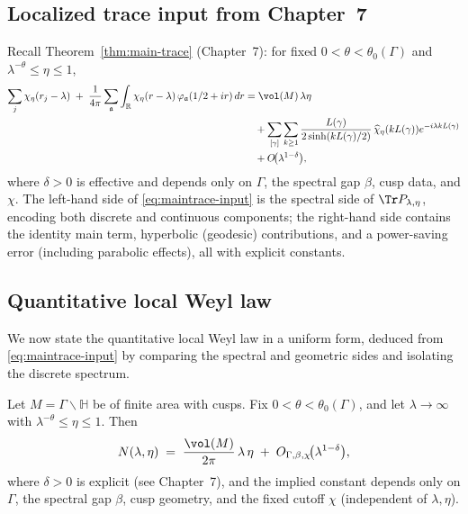 \subsection{Localized trace input from Chapter~7}
Recall Theorem~\ref{thm:main-trace} (Chapter~7): for fixed $0<\theta<\theta_0(\Gamma)$ and $\lambda^{-\theta}\le \eta\le 1$,
\begin{align}\label{eq:maintrace-input}
\sum_{j}\chi_\eta(r_j-\lambda)
\;+\;\frac{1}{4\pi}\sum_{\mathfrak{a}}
\int_{\mathbb{R}}\chi_\eta(r-\lambda)\,\varphi_{\mathfrak{a}}(1/2+ir)\,dr
&=\vol(M)\,\lambda\eta \\
&\quad+\sum_{[\gamma]}\sum_{k\ge 1}
\frac{L(\gamma)}{2\sinh(kL(\gamma)/2)}\,\widehat{\chi}_\eta(kL(\gamma))e^{-i\lambda kL(\gamma)} \nonumber\\
&\quad+O\!\big(\lambda^{1-\delta}\big), \nonumber
\end{align}
where $\delta>0$ is effective and depends only on $\Gamma$, the spectral gap $\beta$, cusp data, and $\chi$. The left-hand side of \eqref{eq:maintrace-input} is the spectral side of $\Tr P_{\lambda,\eta}$, encoding both discrete and continuous components; the right-hand side contains the identity main term, hyperbolic (geodesic) contributions, and a power-saving error (including parabolic effects), all with explicit constants.

\subsection{Quantitative local Weyl law}
We now state the quantitative local Weyl law in a uniform form, deduced from \eqref{eq:maintrace-input} by comparing the spectral and geometric sides and isolating the discrete spectrum.

\begin{theorem}\label{thm:localweyl}
Let $M=\Gamma\backslash\mathbb{H}$ be of finite area with cusps. Fix $0<\theta<\theta_0(\Gamma)$, and let $\lambda\to\infty$ with $\lambda^{-\theta}\le \eta\le 1$. Then
\begin{equation}\label{eq:local-weyl-main}
N(\lambda,\eta)
\;=\; \frac{\vol(M)}{2\pi}\,\lambda\,\eta \;+\; O_{\Gamma,\beta,\chi}\!\big(\lambda^{1-\delta}\big),
\end{equation}
where $\delta>0$ is explicit (see Chapter~7), and the implied constant depends only on $\Gamma$, the spectral gap $\beta$, cusp geometry, and the fixed cutoff $\chi$ (independent of $\lambda,\eta$).
\end{theorem}

